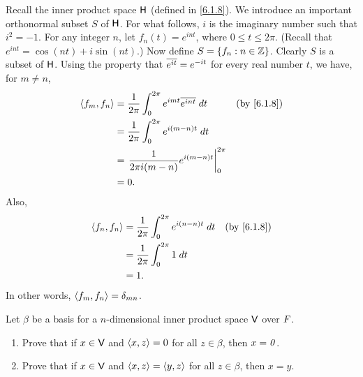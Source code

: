 \begin{eg}\label{6.1.13}
  Recall the inner product space \(\mathsf{H}\) (defined in \cref{6.1.8}).
  We introduce an important orthonormal subset \(S\) of \(\mathsf{H}\).
  For what follows, \(i\) is the imaginary number such that \(i^2 = -1\).
  For any integer \(n\), let \(f_n(t) = e^{int}\), where \(0 \leq t \leq 2\pi\).
  (Recall that \(e^{int} = \cos(nt) + i \sin(nt)\).)
  Now define \(S = \left\lbrace f_n : n \in \mathbb{Z}\right\rbrace\).
  Clearly \(S\) is a subset of \(\mathsf{H}\).
  Using the property that \(\overline{e^{it}} = e^{-it}\) for every real number \(t\), we have, for \(m \neq n\),
  \begin{align*}
    \inn{f_m, f_n} & = \frac{1}{2\pi} \int_0^{2\pi} e^{imt} \conj{e^{int}} \; dt &  & \text{(by \cref{6.1.8})} \\
                   & = \frac{1}{2\pi} \int_0^{2\pi} e^{i(m - n)t} \; dt                                        \\
                   & = \eval{\frac{1}{2\pi i(m - n)} e^{i(m - n)t}}_0^{2\pi}                                   \\
                   & = 0.
  \end{align*}
  Also,
  \begin{align*}
    \inn{f_n, f_n} & = \frac{1}{2\pi} \int_0^{2\pi} e^{i(n - n)t} \; dt &  & \text{(by \cref{6.1.8})} \\
                   & = \frac{1}{2\pi} \int_0^{2\pi} 1 \; dt                                           \\
                   & = 1.
  \end{align*}
  In other words, \(\left\langle f_m, f_n\right\rangle = \delta_{m n}\).
\end{eg}

\exercisesection

\setcounter{ex}{8}
\begin{ex}\label{ex:6.1.9}
  Let \(\beta\) be a basis for a \(n\)-dimensional inner product space \(\mathsf{V}\) over \(\mathit{F}\).
  \begin{enumerate}
    \item Prove that if \(x \in \mathsf{V}\) and \(\left\langle x, z\right\rangle = 0\) for all \(z \in \beta\), then \(x = \mathit{0}\).
    \item Prove that if \(x \in \mathsf{V}\) and \(\left\langle x, z\right\rangle = \left\langle y, z\right\rangle\) for all \(z \in \beta\), then \(x = y\).
  \end{enumerate}
\end{ex}

